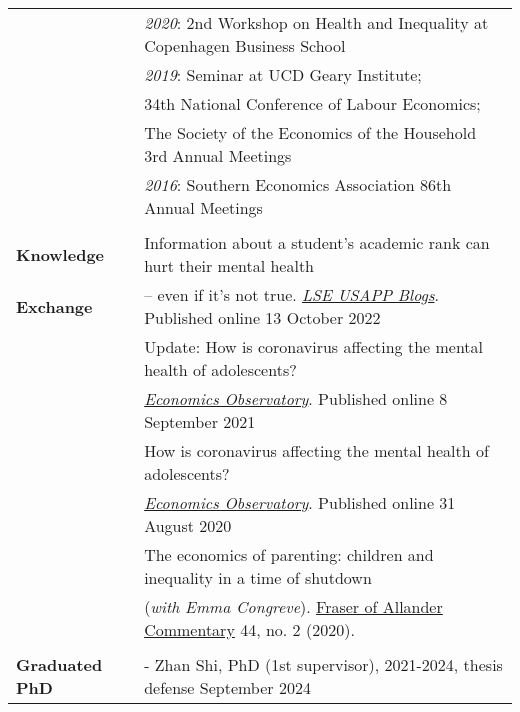 \documentclass[11pt,a4paper]{article}
\begin{document}
\begin{longtable}{l l}
\addlinespace
																												&  \textit{2020}: 2nd Workshop on Health and Inequality at Copenhagen Business School  \\
\addlinespace
																												&  \textit{2019}: Seminar at UCD Geary Institute;   \\
																												&  \quad \quad  \;\; 34th National Conference of Labour Economics;   \\
																												&  \quad \quad  \;\; The Society of the Economics of the Household 3rd Annual Meetings  \\
\addlinespace																												
																												& \textit{2016}: Southern Economics Association 86th Annual Meetings  \\				
																												&  \\
\textbf{Knowledge}                      &  Information about a student's academic rank can hurt their mental health  \\ 
\textbf{Exchange} 									    &  -- even if it's not true. \href{https://bit.ly/3CVAiGP}{\textit{LSE USAPP Blogs}}. Published online 13 October 2022    \\
\addlinespace
																				&  Update: How is coronavirus affecting the mental health of adolescents?    \\
 										 										&  \href{https://www.economicsobservatory.com/update-how-is-coronavirus-affecting-the-mental-health-of-adolescents}{\textit{Economics Observatory}}. Published online 8 September 2021    \\
\addlinespace
																				&  How is coronavirus affecting the mental health of adolescents?   \\
																				&  \href{https://www.economicsobservatory.com/how-coronavirus-affecting-mental-health-adolescents}{\textit{Economics Observatory}}. Published online 31 August 2020  \\		
\addlinespace																						
																				&  The economics of parenting: children and inequality in a time of shutdown  \\ 
																				& (\textit{with Emma Congreve}). \href{https://strathprints.strath.ac.uk/74641/}{Fraser of Allander Commentary} 44, no. 2 (2020).  \\
																				&   \\													
\textbf{Graduated PhD}											            & - Zhan Shi, PhD (1st supervisor), 2021-2024, thesis defense September 2024  \\

\end{longtable}
\end{document}
